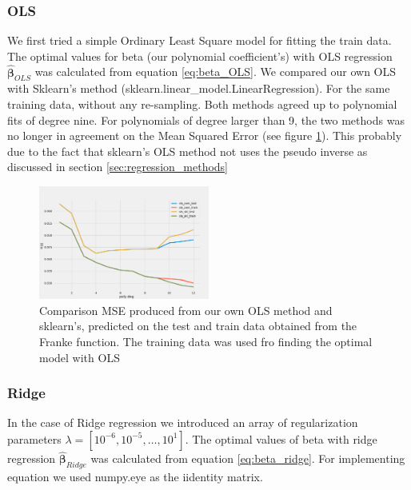 \subsubsection{OLS}
We first tried a simple Ordinary Least Square model for fitting the train data. 
The optimal values for beta (our polynomial coefficient's) with OLS regression $\hat{\bm{\beta}  }_{OLS}$ was
calculated from equation
\eqref{eq:beta_OLS}. We compared our own OLS with Sklearn's method
(sklearn.linear\_model.LinearRegression). For the same training data, without
any re-sampling. Both methods agreed up to polynomial fits of degree nine.
For polynomials of degree larger than 9, the two methods was no longer in
agreement on the Mean Squared Error (see figure \ref{fig:ols_skl_vs_own}). This
probably due to the fact that sklearn's OLS method not uses the pseudo inverse
as discussed in section \ref{sec:regression_methods} 

\begin{figure}[H]
    \centering
    \includegraphics[width=0.5\textwidth]{Figures/test_mse_sklearn_vs_own.png}
    \caption{Comparison MSE produced from our own OLS method and sklearn's,
    predicted on the test and train data obtained from the Franke function. The
training data was used fro finding the optimal model with OLS}  
    \label{fig:ols_skl_vs_own} 
\end{figure}




\subsubsection{Ridge}
In the case of Ridge regression we introduced an array of regularization
parameters $\lambda = [10^{-6}, 10^{-5}, \hdots, 10^{1}]$. The optimal values
of beta with ridge regression $\hat{\bm{\beta } } _{Ridge} $ was calculated
from equation \eqref{eq:beta_ridge}. For implementing equation we used numpy.eye as the iidentity matrix. 

